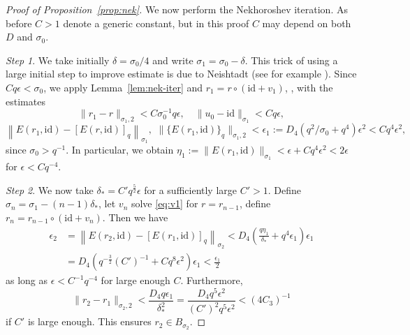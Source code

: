 \documentclass[12pt,reqno]{amsart}
\theoremstyle{remark}
\begin{document}
\begin{proof}[Proof of Proposition~\ref{prop:nek}]
We now perform the Nekhoroshev iteration. As before $C>1$ denote a generic constant, but in this proof $C$ may depend on both $D$ and $\sigma_0$. 

\emph{Step 1}. We take initially $\delta = \sigma_0/4$ and write $\sigma_1 = \sigma_0 - \delta$. This trick of using a large initial step to improve estimate is due to Neishtadt (see for example \cite{LN1992}). Since $Cq \epsilon < \sigma_0$, we apply Lemma~\ref{lem:nek-iter} and $r_1 = r \circ ({\mathrm{id}} + v_1)$, , with the estimates
\[
	\|r_1 - r\|_{\sigma_1, 2} < C \sigma_0^{-1} q \epsilon, \quad\|u_0 - {\mathrm{id}}\|_{\sigma_1} < C q \epsilon, 
\]
\[
\left\| E(r_1, {\mathrm{id}}) - [E(r, {\mathrm{id}})]_q \right\|_{\sigma_1} , \, \,   \|\{E(r_1, {\mathrm{id}})\}_q\|_{\sigma_1, 2}  <   \epsilon_1 := D_4 \left( q^2 /\sigma_0 + q^4 \right) \epsilon^2 < C q^4 \epsilon^2,
\]
since $\sigma_0 > q^{-1}$. In particular, we obtain $\eta_1 := \|E(r_1, {\mathrm{id}})\|_{\sigma_1} < \epsilon + C q^4 \epsilon^2 < 2\epsilon$ for $\epsilon < C q^{-4}$. 

\emph{Step 2}.
We now take $\delta_* = C' q^{\frac52}\epsilon$ for a sufficiently large $C'> 1$. Define $\sigma_n = \sigma_1 - (n-1)\delta_*$, let 
$v_n$ solve \eqref{eq:v1} for $r = r_{n-1}$,  define  $r_n = r_{n-1} \circ ({\mathrm{id}} + v_n)$. Then we have 
\[
\begin{aligned}
 	\epsilon_2 & = \left\| E(r_2, {\mathrm{id}}) - [E(r_1, {\mathrm{id}})]_q \right\|_{\sigma_2} < D_4 \left( \frac{q \eta_1}{\delta_*}+ q^4 \epsilon_1 \right) \epsilon_1  \\
  &= D_4 \left( q^{-\frac32} (C')^{-1} + C q^8 \epsilon^2  \right) \epsilon_1 < \frac{\epsilon_1}2  
\end{aligned}
\]
as long as $\epsilon < C^{-1} q^{-4}$ for large enough $C$. Furthermore,
\[
	\|r_2 - r_1\|_{\sigma_2, 2} < \frac{D_4 q \epsilon_1}{\delta_*^2} = \frac{D_4 q^5 \epsilon^2}{(C')^2 q^5 \epsilon^2} < (4C_3)^{-1}
\]
if $C'$ is large enough. This ensures $r_2 \in B_{\sigma_2}$. 


\end{proof}
\end{document}
